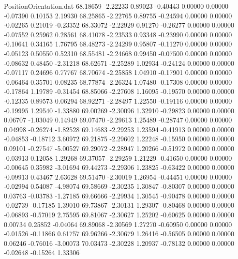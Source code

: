 \begin{filecontents}{PositionOrientation.dat}
  68.18659   -2.22233    0.89023    -0.40443    0.00000    0.00000   -0.07390    0.10153    2.19930
  68.25865   -2.22765    0.89755    -0.24594    0.00000    0.00000   -0.02265    0.21019   -0.23352
  68.33072   -2.22929    0.91270    -0.26277    0.00000    0.00000   -0.07552    0.25962    0.28561
  68.41078   -2.23533    0.93348    -0.23990    0.00000    0.00000   -0.10641    0.34165    1.76795
  68.48273   -2.24299    0.95807    -0.11270    0.00000    0.00000   -0.05123    0.50550    0.52310
  68.55481   -2.24668    0.99450    -0.07500    0.00000    0.00000   -0.08632    0.48450   -2.31218
  68.62671   -2.25289    1.02934    -0.24124    0.00000    0.00000   -0.07117    0.24696    0.77767
  68.70674   -2.25858    1.04910    -0.17901    0.00000    0.00000   -0.06464    0.35701    0.08235
  68.77874   -2.26324    1.07480    -0.17308    0.00000    0.00000   -0.17864    1.19789   -0.31454
  68.85066   -2.27608    1.16095    -0.19570    0.00000    0.00000   -0.12335    0.89573    0.06294
  68.92271   -2.28497    1.22550    -0.19116    0.00000    0.00000   -0.19995    1.29540   -1.33880
  69.00269   -2.30096    1.32910    -0.29823    0.00000    0.00000    0.06707   -1.03049    0.14949
  69.07470   -2.29613    1.25489    -0.28747    0.00000    0.00000    0.04998   -0.26274   -1.82528
  69.14683   -2.29253    1.23594    -0.41913    0.00000    0.00000   -0.04853   -0.18712    3.60972
  69.21875   -2.29602    1.22248    -0.15950    0.00000    0.00000    0.09101   -0.27547   -5.00527
  69.29072   -2.28947    1.20266    -0.51972    0.00000    0.00000   -0.03913    0.12058    1.29268
  69.37057   -2.29259    1.21229    -0.41650    0.00000    0.00000   -0.00645    0.35982   -3.01694
  69.44273   -2.29306    1.23825    -0.63422    0.00000    0.00000   -0.09913    0.43467    2.63628
  69.51470   -2.30019    1.26954    -0.44451    0.00000    0.00000   -0.02994    0.54087   -4.98074
  69.58669   -2.30235    1.30847    -0.80307    0.00000    0.00000    0.03763   -0.03783   -1.27185
  69.66666   -2.29934    1.30545    -0.90478    0.00000    0.00000   -0.02739   -0.17185    1.39010
  69.73867   -2.30131    1.29307    -0.80468    0.00000    0.00000   -0.06893   -0.57019    2.75595
  69.81067   -2.30627    1.25202    -0.60625    0.00000    0.00000    0.00734    0.25852   -0.04064
  69.89068   -2.30569    1.27270    -0.60950    0.00000    0.00000   -0.01526   -0.11866    0.61757
  69.96266   -2.30679    1.26416    -0.56505    0.00000    0.00000    0.06246   -0.76016   -3.00073
  70.03473   -2.30228    1.20937    -0.78132    0.00000    0.00000   -0.02648   -0.15264    1.33306

\end{filecontents}
